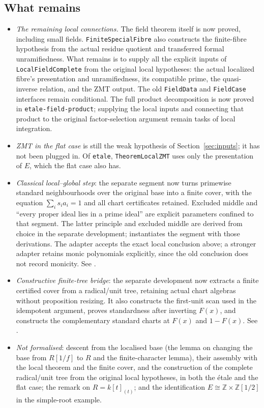 \documentclass[11pt]{amsart}
\numberwithin{equation}{section}
\theoremstyle{definition}
\theoremstyle{remark}
\newcommand{\code}[1]{\texttt{#1}}
\newcommand{\ZZ}{\mathbb Z}
\begin{document}
\subsection{What remains}
\begin{itemize}
\item \emph{The remaining local connections.} The field theorem itself
is now proved, including small fields. \code{FiniteSpecialFibre} also
constructs the finite-fibre hypothesis from the actual residue quotient
and transferred formal unramifiedness. What remains is to supply all
the explicit inputs of \code{LocalFieldComplete} from the original
local hypotheses: the actual localized fibre's presentation and
unramifiedness, its compatible prime, the quasi-inverse relation, and
the ZMT output. The old \code{FieldData} and \code{FieldCase} interfaces
remain conditional. The full product decomposition is now proved in
\code{etale-field-product}; supplying the local inputs and connecting
that product to the original factor-selection argument remain tasks
of local integration.
\item \emph{ZMT in the flat case} is still the weak hypothesis of
Section~\ref{sec:inputs}; it has not been plugged in. Of
\code{etale}, \code{TheoremLocalZMT} uses only the presentation of $E$,
which the flat case also has.
\item \emph{Classical local--global step}: the separate segment
 now turns primewise standard
neighbourhoods over the original base into a finite cover, with the
equation $\sum_i s_i a_i=1$ and all chart certificates retained.
Excluded middle and ``every proper ideal lies in a prime ideal'' are
explicit parameters confined to that segment. The latter principle
and excluded middle are derived from choice in the separate
 development; 
instantiates the segment with those derivations. The adapter accepts the exact
local conclusion above; a stronger adapter retains monic polynomials
explicitly, since the old conclusion does not record monicity.
See .
\item \emph{Constructive finite-tree bridge}: the separate development
 now extracts a finite certified
cover from a radical/unit tree, retaining actual chart algebras without
proposition resizing. It also constructs the first-unit scan used in
the idempotent argument, proves standardness after inverting $F(x)$,
and constructs the complementary standard charts at $F(x)$ and
$1-F(x)$. See .
\item \emph{Not formalised}: descent from the localised base (the lemma
on changing the base from $R[1/f]$ to $R$ and the finite-character lemma),
their assembly with the local theorem and the finite cover, and the
construction of the complete radical/unit tree from the original local
hypotheses, in both the \'etale and the flat case; the
remark on $R=k[t]_{(t)}$; and the identification
$E\cong\ZZ\times\ZZ[1/2]$ in the simple-root example.
\end{itemize}
\end{document}
